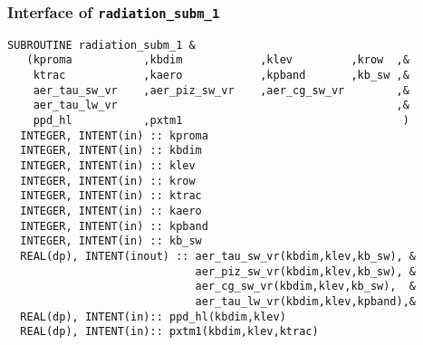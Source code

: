 \subsubsection{Interface of {\tt radiation\_subm\_1}}

\begin{lstlisting}[caption=radiation\_subm\_1]
SUBROUTINE radiation_subm_1 &
   (kproma           ,kbdim            ,klev         ,krow  ,&
    ktrac            ,kaero            ,kpband       ,kb_sw ,&
    aer_tau_sw_vr    ,aer_piz_sw_vr    ,aer_cg_sw_vr        ,&
    aer_tau_lw_vr                                           ,&
    ppd_hl           ,pxtm1                                  )
  INTEGER, INTENT(in) :: kproma
  INTEGER, INTENT(in) :: kbdim 
  INTEGER, INTENT(in) :: klev  
  INTEGER, INTENT(in) :: krow  
  INTEGER, INTENT(in) :: ktrac 
  INTEGER, INTENT(in) :: kaero 
  INTEGER, INTENT(in) :: kpband
  INTEGER, INTENT(in) :: kb_sw 
  REAL(dp), INTENT(inout) :: aer_tau_sw_vr(kbdim,klev,kb_sw), &
                             aer_piz_sw_vr(kbdim,klev,kb_sw), &
                             aer_cg_sw_vr(kbdim,klev,kb_sw),  &
                             aer_tau_lw_vr(kbdim,klev,kpband),&
  REAL(dp), INTENT(in):: ppd_hl(kbdim,klev)     
  REAL(dp), INTENT(in):: pxtm1(kbdim,klev,ktrac)
\end{lstlisting}

